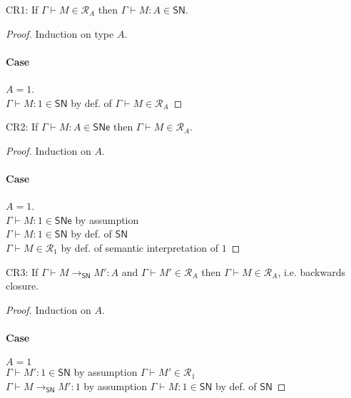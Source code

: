 \documentclass{article}
\makeatletter
\newtheorem*{@thm-nonum}{Theorem}
\newenvironment{theorem*}{\begin{@thm-nonum}\rm}{\end{@thm-nonum}}
\newcommand{\one}{1}
\newcommand{\SN}{\mathsf{SN}}
\newcommand{\SNe}{\mathsf{SNe}}
\newcommand{\CR}{\textsf{CR}}
\newcommand{\denot}[1]{\mathcal{R}_{#1}}
\newcommand{\inden}[3]{#1 \vdash #2 \in \denot{#3}}
\newcommand{\redSN}{\longrightarrow_\SN}
\def\lv{\mathopen{{[\kern-0.14em[}}}    %
\def\rv{\mathclose{{]\kern-0.14em]}}}   %
\newcommand{\den}[1]{\lv #1 \rv}
\makeatother
\begin{document}
\begin{theorem*}
\CR 1: If $\inden{\Gamma}{M}{A}$ then $\Gamma \vdash M : A \in \SN$. %
\end{theorem*}

\begin{proof}
Induction on type $A$.

\paragraph{Case} $A = \one$.
\\[1em]
$\Gamma \vdash M : \one \in \SN$ \hfill by def. of $\inden{\Gamma}{M}{A}$

\end{proof}

\begin{theorem*}
\CR 2: If $\Gamma \vdash M : A \in \SNe$ then $\inden{\Gamma}{M}{A}$. %
\end{theorem*}
\begin{proof}
Induction on $A$.

\paragraph{Case} $A = \one$.
\\[1em]
$\Gamma \vdash M : \one \in \SNe$ \hfill by assumption \\
$\Gamma \vdash M : \one \in \SN$ \hfill by def. of $\SN$\\
$\inden \Gamma M \one$ \hfill by def. of semantic interpretation of $\one$

\end{proof}


\begin{theorem*}
 \CR 3: If $\Gamma \vdash M \redSN M' : A$ and $\inden{\Gamma}{M'}{A}$ then $\inden{\Gamma}{M}{A}$, i.e. backwards closure.
\end{theorem*}
\begin{proof}
Induction on $A$.

\paragraph{Case} $A = \one$
\\[1em]
$\Gamma \vdash M' : \one \in \SN$ \hfill by assumption $\inden{\Gamma}{M'}{\one}$ \\
$\Gamma \vdash M \redSN M' : \one$ \hfill by assumption
$\Gamma \vdash M : \one \in \SN$ \hfill by def. of $\SN$

\end{proof}
\end{document}
